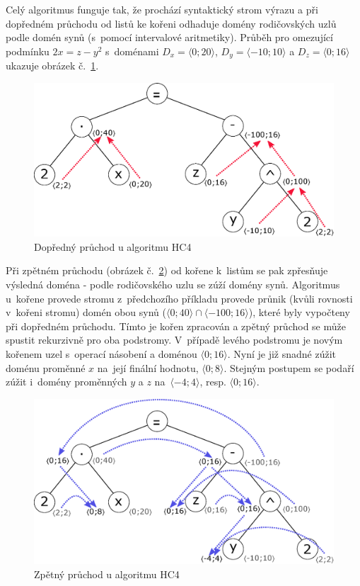 Celý algoritmus funguje tak, že prochází syntaktický strom výrazu a při dopředném průchodu od listů ke kořeni odhaduje domény rodičovských uzlů podle domén synů (s~pomocí intervalové aritmetiky). Průběh pro omezující podmínku $2x = z - y^2$ s~doménami $D_x = \langle 0;20\rangle$, $D_y = \langle -10;10\rangle$ a $D_z = \langle 0;16\rangle$ ukazuje obrázek č.~\ref{img:forwardPropag}.

\begin{figure}
\centering
\includegraphics[scale=.65]{img/forwardPropag.eps}
\caption{Dopředný průchod u algoritmu HC4}
\label{img:forwardPropag}
\end{figure}

Při zpětném průchodu (obrázek č.~\ref{img:backwardPropag}) od kořene k~listům se pak zpřesňuje výsledná doména - podle rodičovského uzlu se zúží domény synů. Algoritmus u~kořene provede stromu z~předchozího příkladu provede průnik (kvůli rovnosti v~kořeni stromu) domén obou synů ($\langle 0;40\rangle \cap \langle -100;16\rangle$), které byly vypočteny při dopředném průchodu. Tímto je kořen zpracován a zpětný průchod se může spustit rekurzivně pro oba podstromy. V~případě levého podstromu je novým kořenem uzel s~operací násobení a doménou $\langle 0;16 \rangle$. Nyní je již snadné zúžit doménu proměnné $x$ na~její finální hodnotu, $\langle 0;8 \rangle$. Stejným postupem se podaří zúžit i~domény proměnných $y$ a $z$ na~$\langle -4;4 \rangle$, resp. $\langle 0;16 \rangle$.

\begin{figure}
\centering
\includegraphics[scale=.65]{img/backwardPropag.eps}
\caption{Zpětný průchod u algoritmu HC4}
\label{img:backwardPropag}
\end{figure}







